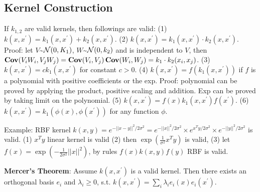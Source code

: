 \subsection*{Kernel Construction}
If $k_{1,2}$ are valid kernels, then followings are valid: (1) $k(x, x^\prime) = k_1(x, x^\prime) + k_2(x, x^\prime)$. (2) $k(x, x^\prime) = k_1(x, x^\prime)\cdot k_2(x, x^\prime)$. Proof: let $V$\textasciitilde$ \mathcal{N}(0, K_1)$, $W$\textasciitilde$ \mathcal{N}(0, k_2)$ and is independent to $V$, then $\operatorname{\textbf{Cov}}(V_i W_i, V_j W_j) = \operatorname{\textbf{Cov}}(V_i, V_j)\operatorname{\textbf{Cov}}(W_i, W_j) = k_1\cdot k_2(x_i, x_j)$. (3) $k(x, x^\prime) = c k_1(x, x^\prime)$ for constant $c>0$. (4) $k(x, x^\prime) = f(k_1(x, x^\prime))$ if $f$ is a polynomial with positive coefficients or the exp. Proof: polynomial can be proved by applying the product, positive scaling and addition. Exp can be proved by taking limit on the polynomial. (5) $k(x, x^\prime) = f(x) k_1(x, x^\prime) f(x^\prime)$. (6) $k(x, x^\prime) = k_1(\phi(x), \phi(x^\prime))$ for any function $\phi$.


Example: RBF kernel $k(x,y) = e^{-||x-y||^2/2\sigma^2} = e^{-||x||^2/2\sigma^2}\times e^{x^T y/2\sigma^2} \times e^{-||y||^2/2\sigma^2}$ is valid. (1) $x^T y$ linear kernel is valid (2) then $\exp(\frac{1}{\sigma^2}x^T y)$ is valid, (3) let $f(x) = \exp(-\frac{1}{2\sigma^2} ||x||^2)$, by rules $f(x) k(x, y) f(y)$ RBF is valid.

\textbf{Mercer's Theorem}: Assume $k(x, x^\prime)$ is a valid kernel. Then there exists an orthogonal basis $e_i$ and $\lambda_i\ge 0$, s.t. $k(x, x^\prime) = \sum_{i} \lambda_i e_i(x) e_i(x^\prime)$.


